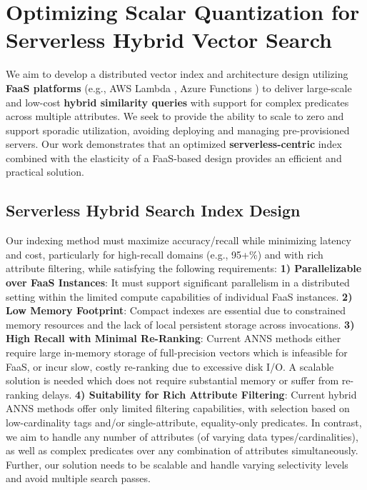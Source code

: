 \section{Optimizing Scalar Quantization for Serverless Hybrid Vector Search}
\label{s:2-osq}



We aim to develop a distributed vector index and architecture design utilizing \textbf{FaaS platforms} (e.g., AWS Lambda \cite{AWSLambdaGeneral}, Azure Functions \cite{AzureFunctionsGeneral}) to deliver large-scale and
low-cost \textbf{hybrid similarity queries} with support for complex predicates across multiple attributes. We seek to provide the ability to scale to zero and support sporadic utilization, avoiding deploying and managing pre-provisioned servers. Our work demonstrates that an optimized \textbf{serverless-centric} index combined with the elasticity of a FaaS-based design provides an efficient and practical solution. 
\subsection{Serverless Hybrid Search Index Design}
\label{ss:2.1-index-design}

Our indexing method must maximize accuracy/recall while minimizing latency and cost, particularly for high-recall domains (e.g., 95+\%) and with rich attribute filtering, while satisfying the following requirements: \textbf{1) Parallelizable over FaaS Instances}: It must support significant parallelism in a distributed setting within the limited compute capabilities of individual FaaS instances.
\textbf{2) Low Memory Footprint}: Compact indexes are essential due to constrained memory resources and the lack of local persistent storage across invocations.
\textbf{3) High Recall with Minimal Re-Ranking}: Current ANNS methods either require large in-memory storage of full-precision vectors which is infeasible for FaaS, or incur slow, costly re-ranking due to excessive disk I/O. A scalable solution is needed which does not require substantial memory or suffer from re-ranking delays.
\textbf{4) Suitability for Rich Attribute Filtering}: Current hybrid ANNS methods offer only limited filtering capabilities, with selection based on low-cardinality tags and/or single-attribute, equality-only predicates. In contrast, we aim to handle any number of attributes (of varying data types/cardinalities), as well as complex predicates over any combination of attributes simultaneously. Further, our solution needs to be scalable and handle varying selectivity levels and avoid multiple search passes. %


